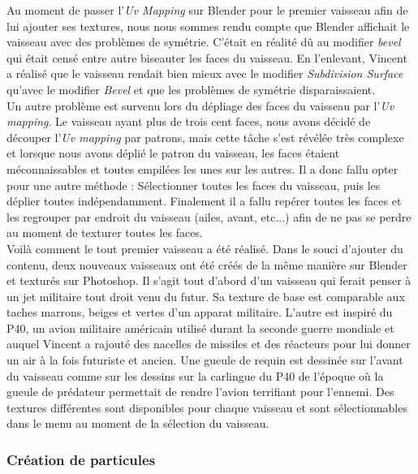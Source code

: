 \documentclass[12pt, titlepage]{article}
\begin{document}
\begin{spacing}{1.5}
Au moment de passer l’\textit{Uv Mapping} sur Blender pour le premier vaisseau afin de lui ajouter ses textures, nous nous sommes rendu compte que Blender affichait le vaisseau avec des problèmes de symétrie. C’était en réalité dû au modifier \textit{bevel} qui était censé entre autre biseauter les faces du vaisseau. En l’enlevant, Vincent a réalisé que le vaisseau rendait bien mieux avec le modifier \textit{Subdivision Surface} qu’avec le modifier \textit{Bevel} et que les problèmes de symétrie disparaissaient.\\

Un autre problème est survenu lors du dépliage des faces du vaisseau par l’\textit{Uv mapping}.
Le vaisseau ayant plus de trois cent faces, nous avons décidé de découper l’\textit{Uv mapping} par patrons, mais cette tâche s’est révélée très complexe et lorsque nous avons déplié le patron du vaisseau, les faces étaient méconnaissables et toutes empilées les unes sur les autres. Il a donc fallu opter pour une autre méthode : Sélectionner toutes les faces du vaisseau, puis les déplier toutes indépendamment. Finalement il a fallu repérer toutes les faces et les regrouper par endroit du vaisseau (ailes, avant, etc...) afin de ne pas se perdre au moment de texturer toutes les faces.\\

Voilà comment le tout premier vaisseau a été réalisé. Dans le souci d'ajouter du contenu, deux nouveaux vaisseaux ont été créés de la même manière sur Blender et texturés sur Photoshop. Il s'agit tout d'abord d'un vaisseau qui ferait penser à un jet militaire tout droit venu du futur. Sa texture de base est comparable aux taches marrons, beiges et vertes d’un apparat militaire. L'autre est inspiré du P40, un avion militaire américain utilisé durant la seconde guerre mondiale et auquel Vincent a rajouté des nacelles de missiles et des réacteurs pour lui donner un air à la fois futuriste et ancien. Une gueule de requin est dessinée sur l’avant du vaisseau comme sur les dessins sur la carlingue du P40 de l’époque où la gueule de prédateur permettait de rendre l’avion terrifiant pour l’ennemi.
Des textures différentes sont disponibles pour chaque vaisseau et sont sélectionnables dans le menu au moment de la sélection du vaisseau.\\

\subsubsection{Création de particules}


\end{spacing}
\end{document}
